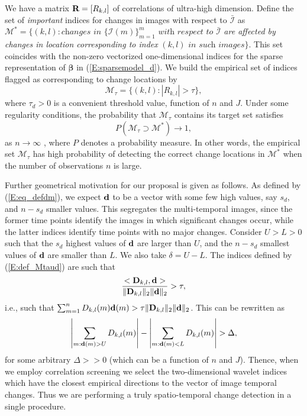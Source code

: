 \documentclass[journal]{IEEEtran}
\newcommand{\vbeta}{\pmb{\beta}}
\newcommand{\vD}{{\textbf D}}
\newcommand{\vd}{{\textbf d}}
\newcommand{\vR}{{\textbf R}}
\begin{document}
We have a matrix $\vR=[R_{k,l}]$ of correlations of ultra-high dimension. Define the set of 
{\it important} indices for changes in images with respect to $\bar{\mathcal I}$ as 
$\mathcal{M}^{*}=\{(k,l): \textit{changes in } \{\mathcal{I}(m)\}_{m=1}^m \textit{ with respect to}$ $\bar{\mathcal{I}}$ \textit{are affected by changes in location corresponding to index} $(k,l)$ $\textit{in such images}\}$.  This set coincides with the non-zero vectorized one-dimensional indices for the sparse representation of $\vbeta$ in (\ref{E:sparsemodel_d}). 
We build the empirical set of indices flagged as corresponding to change locations by
\begin{equation}
\mathcal{M}_{\tau}=\{(k,l):|R_{k,l}|>\tau\},
\label{E:def_Mtaud}
\end{equation}
where $\tau_d>0$ is a convenient threshold value, function of $n$ and $J$. Under some regularity conditions, the probability that $\mathcal{M}_{\tau}$ contains its target set satisfies
\[
P(\mathcal{M}_{\tau}\supset\mathcal{M}^{*})\rightarrow 1,
\]
as $n\rightarrow\infty$ \cite{fan2020statistical}, where $P$ denotes a probability measure. In other words, the empirical set $\mathcal{M}_{\tau}$ has high probability of detecting the correct change locations in $\mathcal{M}^{*}$ when the number of observations $n$ is large.

Further geometrical motivation for our proposal is given as follows. As defined by (\ref{E:eq_defdm}), we expect $\vd$ to be a vector with some few high values, say $s_d$, and $n-s_d$ smaller values. This segregates the multi-temporal images, since the former time points identify the images in which significant changes occur, while the latter indices identify time points with no major changes. Consider $U>L>0$ such that the $s_d$ highest values of $\vd$ are larger than $U$, and the $n-s_d$ smallest values of $\vd$ are smaller than $L$. We also take $\delta=U-L$. The indices defined by  (\ref{E:def_Mtaud}) are such that   
\[
\frac{<\vD_{k,l},\vd>}{\|\vD_{k,l}\|_2\|\vd\|_2}>\tau,
\]
i.e., such that  $\sum_{m=1}^nD_{k,l}(m)\vd(m)>\tau\|\vD_{k,l}\|_2\|\vd\|_2$. This can be rewritten as
\[
\left|\sum_{m:\vd(m)>U} D_{k,l}(m)\right|-\left|\sum_{m:\vd(m)<L} D_{k,l}(m)\right|>\Delta,
\]
for some arbitrary $\Delta>>0$ (which can be a function of $n$ and $J$). Thence, when we employ correlation screening we select the two-dimensional wavelet indices which have the closest empirical directions to the vector of image temporal changes. Thus we are performing a truly spatio-temporal change detection in a single procedure.
\end{document}
